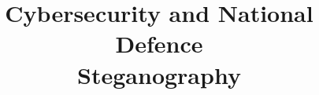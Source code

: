 \documentclass{article}
\title{
    Cybersecurity and National Defence\\
    \Large Steganography}
\author{}
\date{}
\begin{document}
    \maketitle
    \tableofcontents

    \pagebreak
\end{document}
